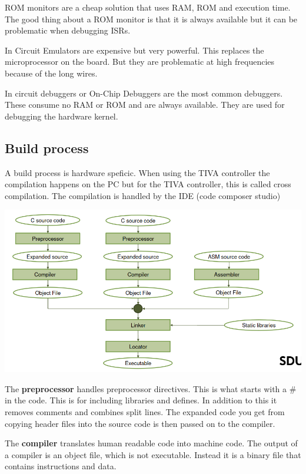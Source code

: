 ROM monitors are a cheap solution that uses RAM, ROM and execution time.
The good thing about a ROM monitor is that it is always available
but it can be problematic when debugging ISRs.

In Circuit Emulators are expensive but very powerful. This replaces the
microprocessor on the board. But they are problematic at high frequencies
because of the long wires.

In circuit debuggers or On-Chip Debuggers are the most common debuggers.
These consume no RAM or ROM and are always available. They are used
for debugging the hardware kernel.



\subsection{Build process}

A build process is hardware speficic. When using the TIVA controller
the compilation happens on the PC but for the TIVA controller, this
is called cross compilation. The compilation is handled by the IDE
(code composer studio)

\begin{center}
	\includegraphics[width=\textwidth]{images/build.png}
\end{center}

The \textbf{preprocessor} handles preprocessor directives. This is what
starts with a \# in the code. This is for including libraries
and defines. In addition to this it removes comments and combines
split lines. The expanded code you get from copying header files
into the source code is then passed on to the compiler.

The \textbf{compiler} translates human readable code into machine code.
The output of a compiler is an object file, which is not executable.
Instead it is a binary file that contains instructions and data.

